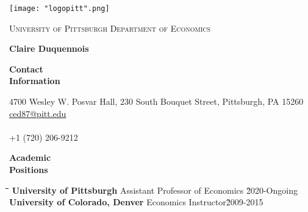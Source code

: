\documentclass[10pt, oneside]{article}
\newcommand\mytabs{\hspace*{1cm}\=\hspace{1cm}\=\hspace{1cm}\=\hspace{1cm}\=\hspace{1cm}\=\hspace{1cm}\=\hspace{1cm}\=\hspace{1cm}\=\hspace{1cm}\=\hspace{1cm}}
\newenvironment{mysec}[1][\mytabs]
  {\begin{tabbing}#1\kill\ignorespaces}
  {\end{tabbing}}
\begin{document}

\texttt{[image: "logopitt".png]} 

\textsc{University of Pittsburgh} \hfill \textsc{Department of Economics}\\
\begin{center}
{\large \bfseries Claire Duquennois} \\
\end{center} 

\begin{minipage}[t]{0.1\linewidth}
\textbf{Contact \\ Information}
\end{minipage}\hspace{0.05\linewidth}
\begin{minipage}[t]{0.8\linewidth}
4700 Wesley W. Posvar Hall, 230 South Bouquet Street, Pittsburgh, PA  15260\\
\href{mailto: ced87@pitt.edu}{ced87@pitt.edu} \\
\href{https://sites.google.com/view/claireduquennois/}{\color{blue}{https://sites.google.com/view/claireduquennois/} }\\
+1 (720) 206-9212
\end{minipage}\vspace{5mm}

\begin{minipage}[t]{0.1\linewidth}
\textbf{Academic\\ Positions}
\end{minipage}\hspace{0.05\linewidth}
\begin{minipage}[t]{0.8\linewidth}
\begin{mysec} 
\textbf{University of Pittsburgh} \>\>\>\>\>\>Assistant Professor of Economics \`2020-Ongoing\\
\textbf{University of Colorado, Denver} \>\>\>\>\>\>Economics Instructor\`2009-2015\\
\end{mysec}
\end{minipage}\vspace{5mm}
\end{document}
